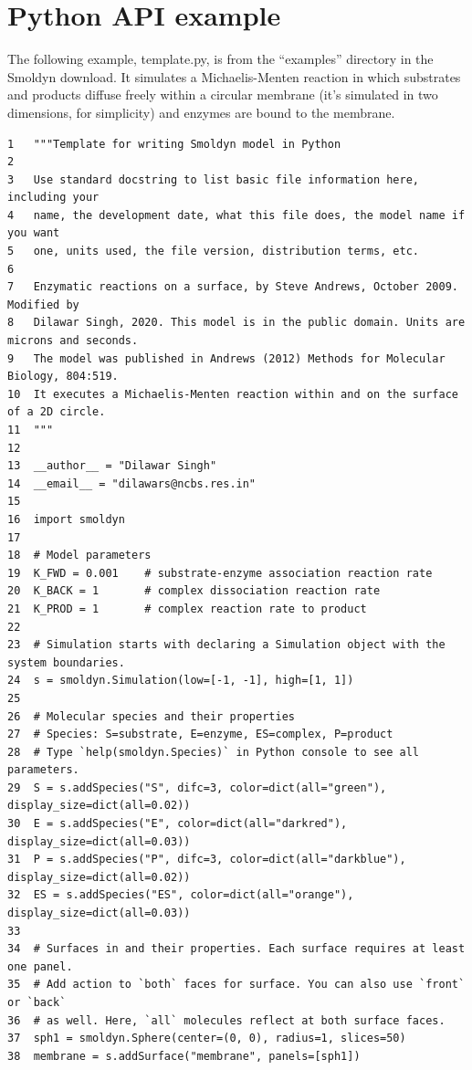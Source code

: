 \documentclass {scrbook}
\begin{document}
\section{Python API example}

The following example, template.py, is from the ``examples'' directory in the Smoldyn download. It simulates a Michaelis-Menten reaction in which substrates and products diffuse freely within a circular membrane (it's simulated in two dimensions, for simplicity) and enzymes are bound to the membrane.

\begin{lstlisting}[style=SSAPython]
1   """Template for writing Smoldyn model in Python
2   
3   Use standard docstring to list basic file information here, including your
4   name, the development date, what this file does, the model name if you want
5   one, units used, the file version, distribution terms, etc.
6   
7   Enzymatic reactions on a surface, by Steve Andrews, October 2009. Modified by
8   Dilawar Singh, 2020. This model is in the public domain. Units are microns and seconds.
9   The model was published in Andrews (2012) Methods for Molecular Biology, 804:519.
10  It executes a Michaelis-Menten reaction within and on the surface of a 2D circle.
11  """
12   
13  __author__ = "Dilawar Singh"
14  __email__ = "dilawars@ncbs.res.in"
15  
16  import smoldyn 
17  
18  # Model parameters
19  K_FWD = 0.001    # substrate-enzyme association reaction rate
20  K_BACK = 1       # complex dissociation reaction rate
21  K_PROD = 1       # complex reaction rate to product
22   
23  # Simulation starts with declaring a Simulation object with the system boundaries.
24  s = smoldyn.Simulation(low=[-1, -1], high=[1, 1])
25  
26  # Molecular species and their properties
27  # Species: S=substrate, E=enzyme, ES=complex, P=product
28  # Type `help(smoldyn.Species)` in Python console to see all parameters.
29  S = s.addSpecies("S", difc=3, color=dict(all="green"), display_size=dict(all=0.02))
30  E = s.addSpecies("E", color=dict(all="darkred"), display_size=dict(all=0.03))
31  P = s.addSpecies("P", difc=3, color=dict(all="darkblue"), display_size=dict(all=0.02))
32  ES = s.addSpecies("ES", color=dict(all="orange"), display_size=dict(all=0.03))
33  
34  # Surfaces in and their properties. Each surface requires at least one panel.
35  # Add action to `both` faces for surface. You can also use `front` or `back`
36  # as well. Here, `all` molecules reflect at both surface faces.
37  sph1 = smoldyn.Sphere(center=(0, 0), radius=1, slices=50)
38  membrane = s.addSurface("membrane", panels=[sph1])

\end{lstlisting}
\end{document}
